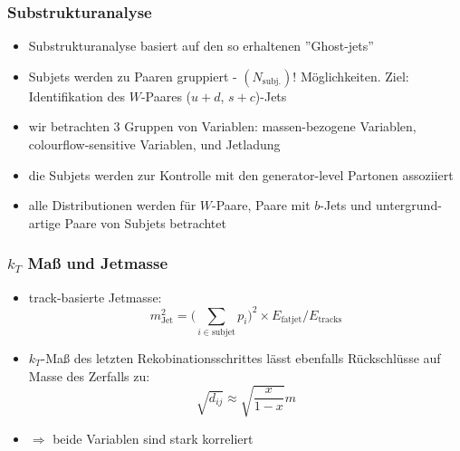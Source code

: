 \documentclass{beamer}
\begin{document}
\begin{frame}
    \frametitle{Substrukturanalyse}
    \begin{itemize}
        \item Substrukturanalyse basiert auf den so erhaltenen ''Ghost-jets''
        \item Subjets werden zu Paaren gruppiert - $(N_{\text{subj.}})!$ Möglichkeiten. Ziel: Identifikation des $W$-Paares ($u+d$, $s+c$)-Jets
        \item wir betrachten 3 Gruppen von Variablen: massen-bezogene Variablen, colourflow-sensitive Variablen, und Jetladung
        \item die Subjets werden zur Kontrolle mit den generator-level Partonen assoziiert
        \item alle Distributionen werden für $W$-Paare, Paare mit $b$-Jets und untergrund-artige Paare von Subjets betrachtet
    \end{itemize}
\end{frame}


\begin{frame}
    \frametitle{$k_T$ Maß und Jetmasse}
    \begin{itemize}
        \item track-basierte Jetmasse:
        \begin{equation}
            m_{\text{Jet}}^2 = \big(\sum_{i \in \text{subjet}}{p_i}\big)^2 \times E_{\text{fatjet}} / E_{\text{tracks}}
        \end{equation}
        \item $k_T$-Maß des letzten Rekobinationsschrittes lässt ebenfalls Rückschlüsse auf Masse des Zerfalls zu:
        \begin{equation}
            \sqrt{d_{ij}} \approx \sqrt{ \frac {x}{1-x} } m
        \end{equation}
        \item $\Rightarrow$ beide Variablen sind stark korreliert
    \end{itemize}
\end{frame}
\end{document}
